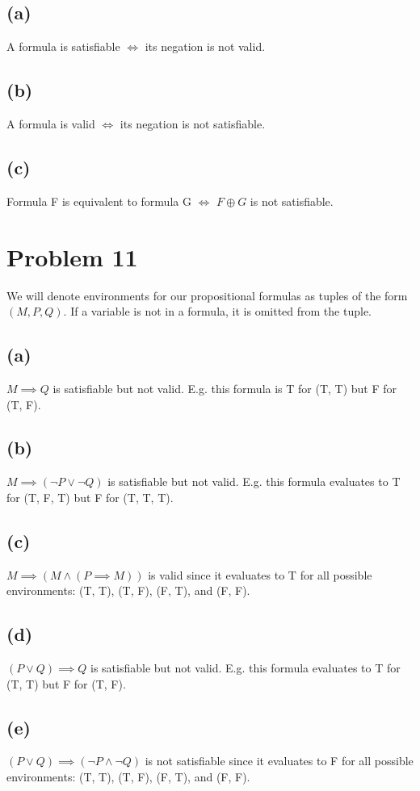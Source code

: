 \documentclass{article}
\begin{document}
\subsection{(a)}
A formula is satisfiable $\iff$ its negation is not valid.
\subsection{(b)}
A formula is valid $\iff$ its negation is not satisfiable.
\subsection{(c)}
Formula F is equivalent to formula G $\iff$ $F \oplus G$ is not satisfiable.

\pagebreak

\section{Problem 11}
We will denote environments for our propositional formulas as tuples of the form $(M, P, Q)$. If a variable is not in a formula, it is omitted from the tuple.

\subsection{(a)}
$M \implies Q$ is satisfiable but not valid. E.g. this formula is T for (T, T) but F for (T, F).

\subsection{(b)}
$M \implies (\neg P \lor \neg Q)$ is satisfiable but not valid. E.g. this formula evaluates to T for (T, F, T) but F for (T, T, T).

\subsection{(c)}
$M \implies (M \land (P \implies M))$ is valid since it evaluates to T for all possible environments: (T, T), (T, F), (F, T), and (F, F).

\subsection{(d)}
$(P \lor Q) \implies Q$ is satisfiable but not valid. E.g. this formula evaluates to T for (T, T) but F for (T, F).

\subsection{(e)}
$(P \lor Q) \implies (\neg P \land \neg Q)$ is not satisfiable since it evaluates to F for all possible environments: (T, T), (T, F), (F, T), and (F, F).
\end{document}
